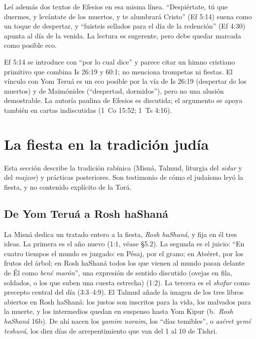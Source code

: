 \documentclass[11pt,letterpaper]{article}
\begin{document}
Leí además dos textos de Efesios en esa misma línea. ``Despiértate, tú que duermes, y levántate de los muertos, y te alumbrará Cristo'' (Ef 5:14) suena como un toque de despertar, y ``fuisteis sellados para el día de la redención'' (Ef 4:30) apunta al día de la venida. La lectura es sugerente, pero debe quedar marcada como posible eco.

\begin{nota}
Ef 5:14 se introduce con ``por lo cual dice'' y parece citar un himno cristiano primitivo que combina Is 26:19 y 60:1; no menciona trompetas ni fiestas. El vínculo con Yom Teruá es un eco posible por la vía de Is 26:19 (despertar de los muertos) y de Maimónides (``despertad, dormidos''), pero no una alusión demostrable. La autoría paulina de Efesios es discutida; el argumento se apoya también en cartas indiscutidas (1~Co 15:52; 1~Ts 4:16).
\end{nota}

\section{La fiesta en la tradición judía}

\begin{nota}[Precisión]
Esta sección describe la tradición rabínica (Misná, Talmud, liturgia del \emph{sidur} y del \emph{majzor}) y prácticas posteriores. Son testimonio de cómo el judaísmo leyó la fiesta, y no contenido explícito de la Torá.
\end{nota}

\subsection{De Yom Teruá a Rosh haShaná}
La Misná dedica un tratado entero a la fiesta, \emph{Rosh haShaná}, y fija en él tres ideas. La primera es el año nuevo (1:1, véase §5.2). La segunda es el juicio: ``En cuatro tiempos el mundo es juzgado: en Pésaj, por el grano; en Atséret, por los frutos del árbol; en Rosh haShaná todos los que vienen al mundo pasan delante de Él como \emph{bené marón}'', una expresión de sentido discutido (ovejas en fila, soldados, o los que suben una cuesta estrecha) (1:2). La tercera es el \emph{shofar} como precepto central del día (3:3--4:9). El Talmud añade la imagen de los tres libros abiertos en Rosh haShaná: los justos son inscritos para la vida, los malvados para la muerte, y los intermedios quedan en suspenso hasta Yom Kipur (b.~\emph{Rosh haShaná} 16b). De ahí nacen los \emph{yamim noraim}, los ``días temibles'', o \emph{aséret yemé teshuvá}, los diez días de arrepentimiento que van del 1 al 10 de Tishri.
\end{document}
